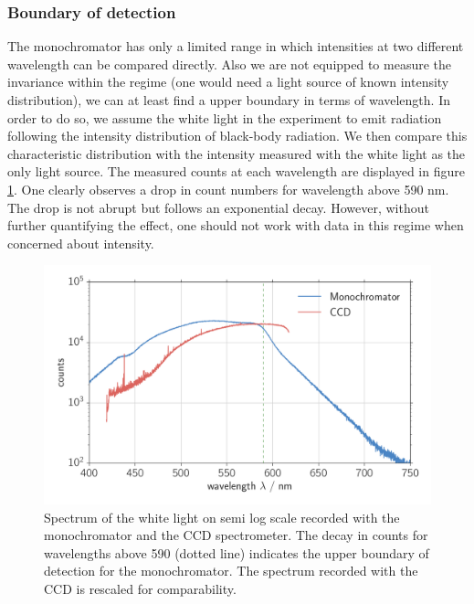 \subsubsection{Boundary of detection}
The monochromator has only a limited range in which intensities at two different wavelength can be compared directly. Also 
we are not equipped to measure the invariance within the regime (one would need a light source of known intensity 
distribution), we can at least find a upper boundary in terms of wavelength. In order to do so, we assume the white light 
in the experiment to emit radiation following the intensity distribution of black-body radiation. We then compare this 
characteristic distribution with the intensity measured with the white light as the only light source. The measured counts 
at each wavelength are displayed in figure \ref{fig:mono_bound}. One clearly observes a drop in count numbers for 
wavelength above 590 nm. The drop is not abrupt but follows an exponential decay. 
However, without further quantifying the effect, one should not work with data in this regime when concerned about 
intensity. 

\begin{figure}[htpb]
    \centering
    \includegraphics[width=0.8\linewidth]{analysis/figures/mono_bound}
    \caption{Spectrum of the white light on semi log scale recorded with the monochromator and the CCD spectrometer. 
        The decay in counts for wavelengths above 590 (dotted line) indicates the upper boundary of detection for the
    monochromator. The spectrum recorded with the CCD is rescaled for comparability. }
    \label{fig:mono_bound}
\end{figure}

